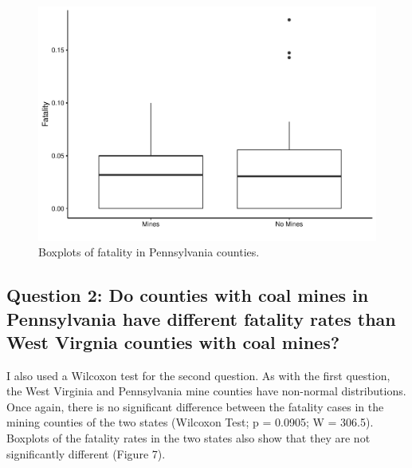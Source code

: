 \documentclass[
  12pt,
]{article}
\begin{document}
\begin{figure}
\centering
\includegraphics{Hancock_ENV872_Project_files/figure-latex/PA_Boxplots-1.pdf}
\caption{Boxplots of fatality in Pennsylvania counties.}
\end{figure}

\hypertarget{question-2-do-counties-with-coal-mines-in-pennsylvania-have-different-fatality-rates-than-west-virgnia-counties-with-coal-mines}{%
\subsection{Question 2: Do counties with coal mines in Pennsylvania have
different fatality rates than West Virgnia counties with coal
mines?}\label{question-2-do-counties-with-coal-mines-in-pennsylvania-have-different-fatality-rates-than-west-virgnia-counties-with-coal-mines}}

I also used a Wilcoxon test for the second question. As with the first
question, the West Virginia and Pennsylvania mine counties have
non-normal distributions. Once again, there is no significant difference
between the fatality cases in the mining counties of the two states
(Wilcoxon Test; p = 0.0905; W = 306.5). Boxplots of the fatality rates
in the two states also show that they are not significantly different
(Figure 7).
\end{document}
